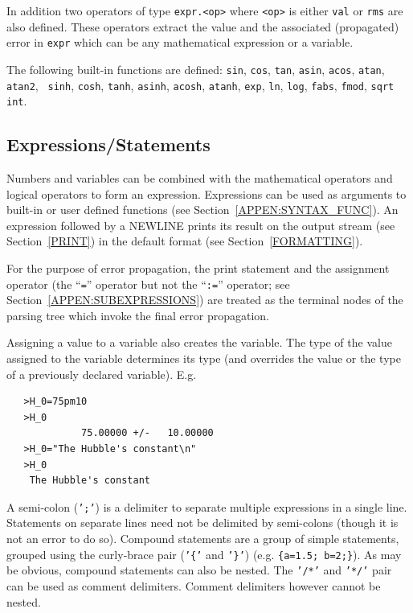 \documentclass[acmtoms,acmnow]{acmtrans2m}
\begin{document}
In addition two operators of type {\tt expr.<op>} where {\tt <op>} is
either {\tt val} or {\tt rms} are also defined.  These operators
extract the value and the associated (propagated) error in {\tt expr}
which can be any mathematical expression or a variable.

The following built-in functions are defined: {\tt sin}, {\tt cos},
{\tt tan}, {\tt asin}, {\tt acos}, {\tt atan}, {\tt atan2}, {\tt
sinh}, {\tt cosh}, {\tt tanh}, {\tt asinh}, {\tt acosh}, {\tt atanh},
{\tt exp}, {\tt ln}, {\tt log}, {\tt fabs}, {\tt fmod}, {\tt sqrt}
{\tt int}.

\subsection{Expressions/Statements}
\label{APPEN:SYNTAX_EXPR}

Numbers and variables can be combined with the mathematical operators
and logical operators to form an expression.  Expressions can be used
as arguments to built-in or user defined functions (see
Section~\ref{APPEN:SYNTAX_FUNC}).  An expression followed by a NEWLINE
prints its result on the output stream (see Section~\ref{PRINT}) in
the default format (see Section~\ref{FORMATTING}).

For the purpose of error propagation, the print statement and the
assignment operator (the ``{\tt =}'' operator but not the ``{\tt :=}''
operator; see Section~\ref{APPEN:SUBEXPRESSIONS}) are treated as the
terminal nodes of the parsing tree which invoke the final error
propagation.

Assigning a value to a variable also creates the variable.  The type
of the value assigned to the variable determines its type (and overrides
the value or the type of a previously declared variable).  E.g.
\begin{verbatim}
   >H_0=75pm10
   >H_0
             75.00000 +/-   10.00000
   >H_0="The Hubble's constant\n"
   >H_0
    The Hubble's constant
\end{verbatim}
A semi-colon ({\tt ';'}) is a delimiter to separate multiple
expressions in a single line.  Statements on separate lines need not
be delimited by semi-colons (though it is not an error to do so).
Compound statements are a group of simple statements, grouped using the
curly-brace pair ({\tt '\{'} and {\tt '\}'}) (e.g. {\tt \{a=1.5;
b=2;\}}). As may be obvious, compound statements can also be nested.
The {\tt '/\/*'} and {\tt '*/'} pair can be used as comment
delimiters.  Comment delimiters however cannot be nested. 
\end{document}
